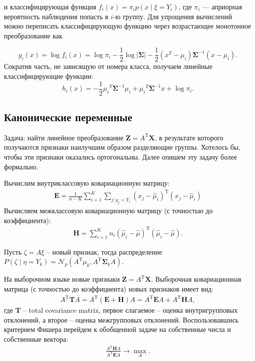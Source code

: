 \documentclass{article}
\begin{document}
	и классифицирующая функция $f_i\left(x\right) = \pi_i p\left(x\middle\vert \xi = Y_i\right)$, где $\pi_i$ --- априорная вероятность наблюдения попасть в $i$-ю группу. Для упрощения вычислений можно переписать классифицирующую функцию через возрастающее монотонное преобразование как
	
	$$g_i\left(x\right) = \log f_i\left(x\right) = \log \pi_i - \frac{1}{2}\log\left\vert\bm{\Sigma}\right\vert -  \frac{1}{2}{\left(x^T -\mu_i\right)}\bm{\Sigma}^{-1}\left(x -\mu_i\right).$$
	Сократив часть, не зависящую от номера класса, получаем линейные классифицирующие функции:
	$$h_i(x) = -\frac{1}{2}{\mu_i}^T\bm{\Sigma}^{-1}\mu_i + {\mu_i}^T\bm{\Sigma}^{-1}x + \log\pi_i.$$
	
	\subsection{Канонические переменные}
	
	Задача: найти линейное преобразование $\mathbf{Z} = A^\mathrm{T}\mathbf{X}$, в результате которого получаются признаки наилучшим образом разделяющие группы.  Хотелось бы, чтобы эти признаки оказались ортогональны. Далее опишем эту задачу более формально.
	
	Вычислим внутриклассовую ковариационную матрицу:
		\begin{align*}
			\mathbf{E} = \frac{1}{n - K} \sum\limits_{i = 1}^K \sum_{j: y_j = Y_i} (x_j - \widehat{\mu}_i)^\mathrm{T}(x_j - \widehat{\mu}_i)
		\end{align*}
		Вычисляем межклассовую ковариационную матрицу (с точностью до коэффициента):
		\begin{align*}
			\mathbf{H} = \sum\limits_{i = 1}^K n_i (\widehat{\mu}_i - \widehat{\mu})^\mathrm{T}(\widehat{\mu}_i - \widehat{\mu}).
		\end{align*}
	
	Пусть $\zeta = A\xi$ -- новый признак, тогда распределение $P(\zeta \mid \eta = Y_k) = \mathcal{N}_p(A^\mathrm{T}\mu_k, A^\mathrm{T}\mathbf{\Sigma}_kA)$.
	
	На выборочном языке новые признаки $\mathbf{Z} =A^\mathrm{T}\mathbf{X}$. Выборочная ковариационная матрица (с точностью до коэффициента) новых признаков имеет вид:
	\begin{align*}
		A^\mathrm{T}\mathbf{T}A = A^\mathrm{T}(\mathbf{E} + \mathbf{H})A = A^\mathrm{T}\mathbf{E}A + A^\mathrm{T}\mathbf{H}A,
	\end{align*}
	где $\mathbf{T}$ -- total covariance matrix, первое слагаемое -- оценка внутригрупповых отклонений, а второе -- оценка межгрупповых отклонений. Воспользовавшись критерием Фишера перейдем к обобщенной задаче на собственные числа и собственные вектора:
	\begin{align*}
		\frac{A^\mathrm{T}\mathbf{H}A}{A^\mathrm{T}\mathbf{E}A} \rightarrow \max_{A}.
	\end{align*}
	
\end{document}
